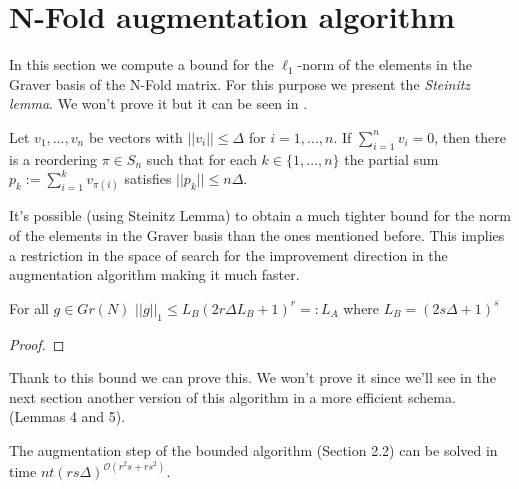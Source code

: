 \section{N-Fold augmentation algorithm}


In this section we compute a bound for the $\ell_1$-norm of the elements in the Graver basis of the N-Fold matrix. For this purpose we present the \textit{Steinitz lemma}. We won't prove it but it can be seen in \cite{STEINITZ:1913}.

\begin{lemma}
    Let $v_1,...,v_n$ be vectors with $||v_i|| \leq \Delta$ for $i = 1,...,n$. If $\sum_{i=1}^{n} v_i = 0$, then there is a reordering $\pi \in S_n$ such that for each $k \in \{1,...,n\}$ the partial sum $p_k := \sum_{i=1}^{k}v_{\pi(i)}$ satisfies $||p_k|| \leq n\Delta$.
\end{lemma}

It's possible (using Steinitz Lemma) to obtain a much tighter bound for the norm of the elements in the Graver basis than the ones mentioned before. This implies a restriction in the space of search for the improvement direction in the augmentation algorithm making it much faster.

\begin{lemma}
    For all $g \in Gr(N)$ $||g||_1 \leq L_B (2r\Delta L_B + 1)^r =: L_A$ where $L_B = (2s \Delta + 1)^s$
\end{lemma}
\vspace{-20pt}
\begin{proof}
\end{proof}

Thank to this bound we can prove this. We won't prove it since we'll see in the next section another version of this algorithm in a more efficient schema. \cite{EISENBRAND:2018} (Lemmas 4 and 5).

\begin{lemma}
The augmentation step of the bounded algorithm (Section 2.2) can be solved in time $nt(rs\Delta)^{\mathcal{O}(r^2s+rs^2)}$.
\end{lemma}

